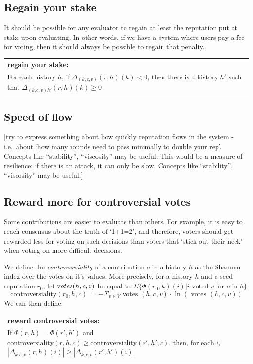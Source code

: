 \documentclass{article}
\newcommand{\flow}{\Phi}
\newenvironment{condition}[1]
	{
	\begin{center}
	   \begin{tabular}{|p{.9\textwidth}|}
		\hline \medskip
		{\bf #1:}\\
	}
	{
		\medskip \\\hline
	\end{tabular}
	\end{center}
	}
\begin{document}
\subsection{Regain your stake}
It should be possible for any evaluator to regain at least the reputation put at stake upon evaluating. In other words, if we have a system where users pay a fee for voting, then it should always be possible to regain that penalty. 
\begin{condition}{regain your stake}
For each history $h$, if $\Delta_{(k, c, v)}(r, h)(k) < 0$, then there is a history $h'$ such that $\Delta_{(k,c,v)h'}(r, h)(k) \geq 0$ 
\end{condition}


\subsection{Speed of flow}

[try to express something about how quickly reputation flows in the system - i.e.\ about `how many rounds need to pass minimally to double your rep'. Concepts like ``stability'', ``viscosity'' may be useful. This would be a measure of resilience: if there is an attack, it can only be slow. Concepts like ``stability'', ``viscosity'' may be useful.]


\subsection{Reward more for controversial votes}

Some contributions are easier to evaluate than others. For example, it is easy to reach consensus about the truth of `1+1=2', and therefore, voters should get rewarded less for voting on such decisions than voters that `stick out their neck' when voting on more difficult decisions.

We define the {\em controversiality} of a contribution $c$ in a history $h$ as the Shannon index over the votes on it's values. More precisely, for a history $h$ and a seed reputation $r_0$, let ${\mbox votes}(h, c, v)$ be equal to $\Sigma \{\Phi(r_0, h)(i)| i \mbox{ voted } v \mbox{ for } c \mbox{ in } h \}$.
\begin{equation}
\mbox{controversiality}(r_0, h, c) := - \Sigma_{v\in V} \mbox{ votes }(h, c, v) \cdot \mbox{ ln }(\mbox{ votes }(h, c, v))
\end{equation}
We can then define:
\begin{condition}{reward controversial votes}
If $\flow(r, h) = \flow(r', h')$ and $\mbox{controversiality}(r, h, c) \geq \mbox{controversiality}(r', h', c)$, then, for each $i$, $|\Delta_{k, c, v}(r, h)(i)| \geq |\Delta_{k, c, v}(r', h')(i)|$
\end{condition} 
\end{document}
